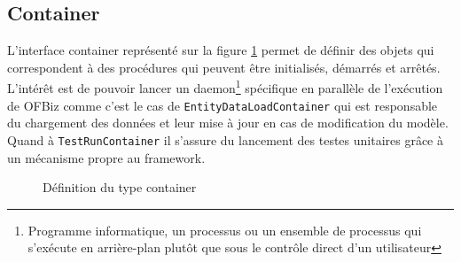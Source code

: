 \subsection{Container}
L'interface container représenté sur la figure \ref{container} permet de définir des objets qui correspondent à des procédures qui peuvent être initialisés, démarrés et arrêtés. L'intérêt est de pouvoir lancer un daemon\footnote{Programme informatique, un processus ou un ensemble de processus qui s'exécute en arrière-plan plutôt que sous le contrôle direct d'un utilisateur} spécifique en parallèle de l'exécution de OFBiz comme c'est le cas de \verb|EntityDataLoadContainer| qui est responsable du chargement des données et leur mise à jour en cas de modification du modèle. Quand à \verb|TestRunContainer| il s'assure du lancement des testes unitaires grâce à un mécanisme propre au framework. 
\begin{figure}[h!]
	\centering
	
	
	\caption{Définition du type container}
	\label{container}
\end{figure}
